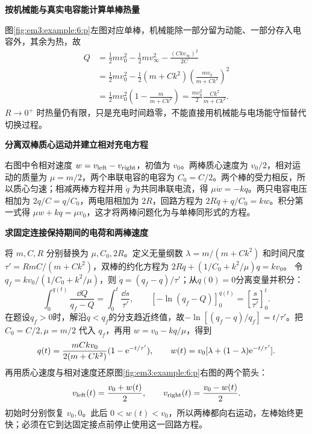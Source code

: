 \begin{solution}
\par\medskip{}\noindent\textbf{按机械能与真实电容能计算单棒热量}\par\nobreak
图\ref{fig:em3:example:6:p}左图对应单棒，机械能除一部分留为动能、一部分存入电容外，其余为热，故
\[
 \begin{aligned}
 Q&=\frac12mv_0^2-\frac12mv_\infty^2-\frac{(Ckv_\infty)^2}{2C}\\
 &=\frac12mv_0^2-\frac12(m+Ck^2)
       \left(\frac{mv_0}{m+Ck^2}\right)^2\\
 &=\frac12mv_0^2\left(1-\frac m{m+Ck^2}\right)
 =\frac{mv_0^2}{2}\frac{Ck^2}{m+Ck^2}.
 \end{aligned}
\]
$R\to0^+$ 时热量仍有限，只是充电时间趋零，不能直接用机械能与电场能守恒替代切换过程。



\par\medskip{}\noindent\textbf{分离双棒质心运动并建立相对充电方程}\par\nobreak
右图中令相对速度 $w=v_{\rm left}-v_{\rm right}$，初值为 $v_0$。两棒质心速度为 $v_0/2$，相对运动的质量为 $\mu=m/2$，两个串联电容的电容为 $C_0=C/2$。两个棒的受力相反，所以质心匀速；相减两棒方程并用 $\dot q$ 为共同串联电流，得 $\mu\dot w=-k\dot q$。两只电容电压相加为 $2q/C=q/C_0$，两电阻相加为 $2R$，回路方程为 $2R\dot q+q/C_0=kw$。积分第一式得 $\mu w+kq=\mu v_0$，这才将两棒问题化为与单棒同形式的方程。



\par\medskip{}\noindent\textbf{求固定连接保持期间的电荷和两棒速度}\par\nobreak
将 $m,C,R$ 分别替换为 $\mu,C_0,2R$。定义无量纲数 $\lambda=m/(m+Ck^2)$ 和时间尺度 $\tau'=RmC/(m+Ck^2)$，双棒的约化方程为
$2R\dot q+(1/C_0+k^2/\mu)q=kv_0$。
令 $q_f=kv_0/(1/C_0+k^2/\mu)$，则
$\dot q=(q_f-q)/\tau'$；从$q(0)=0$分离变量并积分：
\[
\int_0^{q(t)}\frac{\dd Q}{q_f-Q}
=\int_0^t\frac{\dd s}{\tau'},
\qquad
[-\ln(q_f-Q)]_0^{q(t)}=\left[\frac{s}{\tau'}\right]_0^t.
\]
在题设$q_f>0$时，解沿$q<q_f$的分支趋近终值，故$-\ln[(q_f-q)/q_f]=t/\tau'$。把 $C_0=C/2,\mu=m/2$ 代入 $q_f$，再用 $w=v_0-kq/\mu$，得到
\[
q(t)=\frac{mCkv_0}{2(m+Ck^2)}(1-\mathrm e^{-t/\tau'}),\qquad
w(t)=v_0[\lambda+(1-\lambda)\mathrm e^{-t/\tau'}].
\]
再用质心速度与相对速度还原图\ref{fig:em3:example:6:p}右图的两个箭头：
\[
v_{\rm left}(t)=\frac{v_0+w(t)}2,\qquad
v_{\rm right}(t)=\frac{v_0-w(t)}2.
\]
初始时分别恢复 $v_0,0$。此后 $0<w(t)<v_0$，所以两棒都向右运动，左棒始终更快；必须在它到达固定接点前停止使用这一回路方程。


\end{solution}
